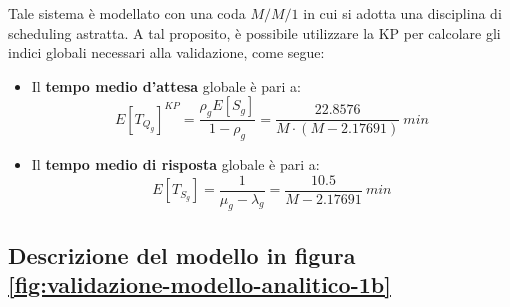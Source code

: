 Tale sistema è modellato con una coda $M/M/1$ in cui si adotta una disciplina di scheduling astratta. A tal proposito, è possibile utilizzare la KP per calcolare gli indici globali necessari alla validazione, come segue:
\begin{itemize}
\item Il \textbf{tempo medio d'attesa} globale è pari a:
\begin{equation}
\label{eqn:validazione-11}
E[T_{Q_g}]^{KP} = \frac{\rho_g E[S_g]}{1-\rho_g} = \frac{22.8576}{M\cdot (M-2.17691)}\ min
\end{equation}
\item Il \textbf{tempo medio di risposta} globale è pari a:
\begin{equation}
\label{eqn:validazione-13}
E[T_{S_g}] = \frac{1}{\mu_g - \lambda_g} = \frac{10.5}{M-2.17691}\ min
\end{equation}
\end{itemize}

\subsection{Descrizione del modello in figura \ref{fig:validazione-modello-analitico-1b}}

